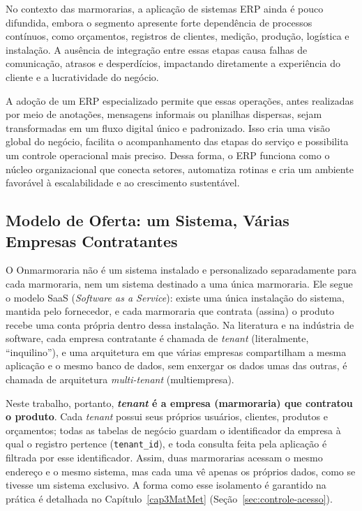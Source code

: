 No contexto das marmorarias, a aplicação de sistemas ERP ainda é pouco difundida, embora o segmento apresente forte dependência de processos contínuos, como orçamentos, registros de clientes, medição, produção, logística e instalação. A ausência de integração entre essas etapas causa falhas de comunicação, atrasos e desperdícios, impactando diretamente a experiência do cliente e a lucratividade do negócio.

A adoção de um ERP especializado permite que essas operações, antes realizadas por meio de anotações, mensagens informais ou planilhas dispersas, sejam transformadas em um fluxo digital único e padronizado. Isso cria uma visão global do negócio, facilita o acompanhamento das etapas do serviço e possibilita um controle operacional mais preciso. Dessa forma, o ERP funciona como o núcleo organizacional que conecta setores, automatiza rotinas e cria um ambiente favorável à escalabilidade e ao crescimento sustentável.

\subsection{Modelo de Oferta: um Sistema, Várias Empresas Contratantes}
\label{sec:modelo-multitenant}

O Onmarmoraria não é um sistema instalado e personalizado separadamente para cada marmoraria, nem um sistema destinado a uma única marmoraria. Ele segue o modelo SaaS (\textit{Software as a Service}): existe uma única instalação do sistema, mantida pelo fornecedor, e cada marmoraria que contrata (assina) o produto recebe uma conta própria dentro dessa instalação. Na literatura e na indústria de software, cada empresa contratante é chamada de \textit{tenant} (literalmente, ``inquilino''), e uma arquitetura em que várias empresas compartilham a mesma aplicação e o mesmo banco de dados, sem enxergar os dados umas das outras, é chamada de arquitetura \textit{multi-tenant} (multiempresa).

Neste trabalho, portanto, \textbf{\textit{tenant} é a empresa (marmoraria) que contratou o produto}. Cada \textit{tenant} possui seus próprios usuários, clientes, produtos e orçamentos; todas as tabelas de negócio guardam o identificador da empresa à qual o registro pertence (\texttt{tenant\_id}), e toda consulta feita pela aplicação é filtrada por esse identificador. Assim, duas marmorarias acessam o mesmo endereço e o mesmo sistema, mas cada uma vê apenas os próprios dados, como se tivesse um sistema exclusivo. A forma como esse isolamento é garantido na prática é detalhada no Capítulo~\ref{cap3MatMet} (Seção~\ref{sec:controle-acesso}).

